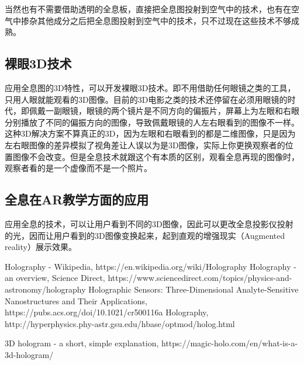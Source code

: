 \documentclass{article}
\begin{document}
\begin{multicols}{2}
当然也有不需要借助透明的全息板，直接把全息图投射到空气中的技术，也有在空气中掺杂其他成分之后把全息图投射到空气中的技术，只不过现在这些技术不够成熟。

\subsection{裸眼3D技术}

应用全息图的3D特性，可以开发裸眼3D技术。即不用借助任何眼镜之类的工具，只用人眼就能观看的3D图像。目前的3D电影之类的技术还停留在必须用眼镜的时代，即佩戴一副眼镜，眼镜的两个镜片是不同方向的偏振片，屏幕上为左眼和右眼分别播放了不同的偏振方向的图像，导致佩戴眼镜的人左右眼看到的图像不一样。这种3D解决方案不算真正的3D，因为左眼和右眼看到的都是二维图像，只是因为左右眼图像的差异模拟了视角差让人误以为是3D图像，实际上你更换观察者的位置图像不会改变。但是全息技术就跟这个有本质的区别，观看全息再现的图像时，观察者看的是一个虚像而不是一个照片。

\subsection{全息在AR教学方面的应用}

应用全息的技术，可以让用户看到不同的3D图像，因此可以更改全息投影仪投射的光，因而让用户看到的3D图像变换起来，起到直观的增强现实（Augmented reality）展示效果。

\end{multicols}

\begin{thebibliography}{99}  
 Holography - Wikipedia, https://en.wikipedia.org/wiki/Holography
 Holography - an overview, Science Direct, https://www.sciencedirect.com/topics/physics-and-astronomy/holography
 Holographic Sensors: Three-Dimensional Analyte-Sensitive Nanostructures and Their Applications, https://pubs.acs.org/doi/10.1021/cr500116a
 Holography, http://hyperphysics.phy-astr.gsu.edu/hbase/optmod/holog.html

 3D hologram - a short, simple explanation, https://magic-holo.com/en/what-is-a-3d-hologram/

\end{thebibliography}
\end{document}
